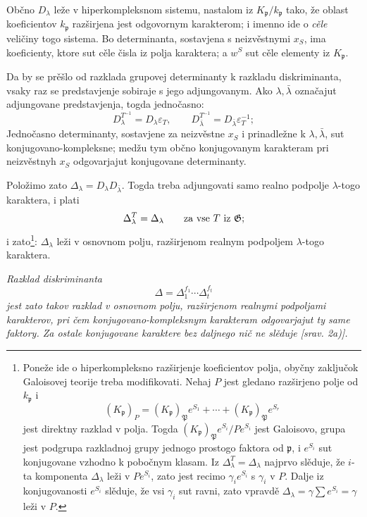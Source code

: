 \documentclass[11pt]{article}
\providecommand{\frakp}{\mathfrak{p}}
\providecommand{\Gg}{\mathfrak{G}}
\begin{document}
Občno \(D_\lambda\) leže v hiperkompleksnom sistemu, nastalom iz \(K_\frakp/k_\frakp\) tako, že oblast koeficientov \(k_\frakp\) razširjena jest odgovornym karakterom; i imenno ide o \emph{cěle} veličiny togo sistema. Bo determinanta, sostavjena s neizvěstnymi \(x_S\), ima koeficienty, ktore sut cěle čisla iz polja karaktera; a \(w^S\) sut cěle elementy iz \(K_\frakp\).

Da by se prěšlo od razklada grupovej determinanty k razkladu diskriminanta, vsaky raz se predstavjenje sobiraje s jego adjungovanym. Ako \(\lambda,\bar\lambda\) označajut adjungovane predstavjenja, togda jednočasno:
\[
        D_\lambda^{T^{-1}}=D_\lambda\varepsilon_T,
        \qquad
        D_{\bar\lambda}^{T^{-1}}=D_{\bar\lambda}\varepsilon_T^{-1};
\]
Jednočasno determinanty, sostavjene za neizvěstne \(x_S\) i prinadležne k \(\lambda,\bar\lambda\), sut konjugovano-kompleksne; medžu tym občno konjugovanym karakteram pri neizvěstnyh \(x_S\) odgovarjajut konjugovane determinanty.

Položimo zato \(\Delta_\lambda=D_\lambda D_{\bar\lambda}\). Togda treba adjungovati samo realno podpolje \(\lambda\)-togo karaktera, i plati
\[
        \Delta_\lambda^T=\Delta_\lambda
        \qquad\hbox{za vse }T\hbox{ iz }\Gg;
\]
i zato\footnote{Poneže ide o hiperkompleksno razširjenje koeficientov polja, obyčny zaključok Galoisovej teorije treba modifikovati. Nehaj \(P\) jest gledano razširjeno polje od \(k_\frakp\) i
\[
        (K_\frakp)_P=(K_\frakp)_\mathfrak P e^{S_1}+\cdots+(K_\frakp)_\mathfrak P e^{S_r}
\]
jest direktny razklad v polja. Togda \((K_\frakp)_\mathfrak P e^{S_i}/Pe^{S_i}\) jest Galoisovo, grupa jest podgrupa razkladnoj grupy jednogo prostogo faktora od \(\frakp\), i \(e^{S_i}\) sut konjugovane vzhodno k pobočnym klasam. Iz \(\Delta_\lambda^T=\Delta_\lambda\) najprvo slěduje, že \(i\)-ta komponenta \(\Delta_\lambda\) leži v \(Pe^{S_i}\), zato jest recimo \(\gamma_i e^{S_i}\) s \(\gamma_i\) v \(P\). Dalje iz konjugovanosti \(e^{S_i}\) slěduje, že vsi \(\gamma_i\) sut ravni, zato vpravdě \(\Delta_\lambda=\gamma\sum e^{S_i}=\gamma\) leži v \(P\).}: \(\Delta_\lambda\) leži v osnovnom polju, razširjenom realnym podpoljem \(\lambda\)-togo karaktera.

\emph{Razklad diskriminanta}
\[
        \Delta=\Delta_1^{f_1}\cdots\Delta_t^{f_t}
\]
\emph{jest zato takov razklad v osnovnom polju, razširjenom realnymi podpoljami karakterov, pri čem konjugovano-kompleksnym karakteram odgovarjajut ty same faktory. Za ostale konjugovane karaktere bez daljnego nič ne slěduje [srav. 2a)].}
\end{document}
